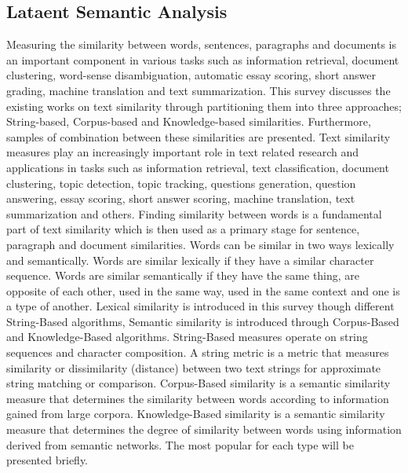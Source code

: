 \subsection{Lataent Semantic Analysis}
Measuring the similarity between words, sentences, paragraphs and documents is an important component in various tasks such as information retrieval, document clustering, word-sense disambiguation, automatic essay scoring, short answer grading, machine translation and text summarization. 
This survey discusses the existing works on text similarity through partitioning them into three approaches; String-based, Corpus-based and Knowledge-based similarities. 
Furthermore, samples of combination between these similarities are presented.
Text similarity measures play an increasingly important role in text related research and applications in tasks such as information retrieval, text classification, document clustering, topic detection, topic tracking, questions generation, question answering, essay scoring, short answer scoring, machine translation, text summarization and others. 
Finding similarity between words is a fundamental part of text similarity which is then used as a primary stage for sentence, paragraph and document similarities. 
Words can be similar in two ways lexically and semantically. Words are similar lexically if they have a similar character sequence. Words are similar semantically if they have the same thing, are opposite of each other, used in the same way, used in the same context and one is a type of another. 
Lexical similarity is introduced in this survey though different String-Based algorithms, Semantic similarity is introduced through Corpus-Based and Knowledge-Based algorithms. 
String-Based measures operate on string sequences and character composition. A string metric is a metric that measures similarity or dissimilarity (distance) between two text strings for approximate string matching or comparison. 
Corpus-Based similarity is a semantic similarity measure that determines the similarity between words according to information gained from large corpora. 
Knowledge-Based similarity is a semantic similarity measure that determines the degree of similarity between words using information derived from semantic networks. The most popular for each type will be presented briefly.
 

